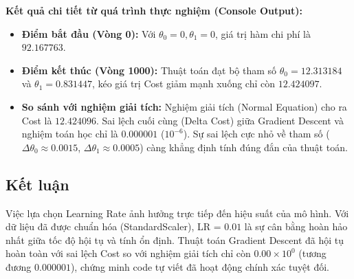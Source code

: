 \textbf{Kết quả chi tiết từ quá trình thực nghiệm (Console Output):}
\begin{itemize}
    \item \textbf{Điểm bắt đầu (Vòng 0):} Với \(\theta_0 = 0, \theta_1 = 0\), giá trị hàm chi phí là \(92.167763\).
    \item \textbf{Điểm kết thúc (Vòng 1000):} Thuật toán đạt bộ tham số \(\theta_0 = 12.313184\) và \(\theta_1 = 0.831447\), kéo giá trị Cost giảm mạnh xuống chỉ còn \(12.424097\).
    \item \textbf{So sánh với nghiệm giải tích:} Nghiệm giải tích (Normal Equation) cho ra Cost là \(12.424096\). Sai lệch cuối cùng (Delta Cost) giữa Gradient Descent và nghiệm toán học chỉ là \(0.000001\) (\(10^{-6}\)). Sự sai lệch cực nhỏ về tham số (\(\Delta\theta_0 \approx 0.0015\), \(\Delta\theta_1 \approx 0.0005\)) càng khẳng định tính đúng đắn của thuật toán.
\end{itemize}

\subsection{Kết luận}
Việc lựa chọn Learning Rate ảnh hưởng trực tiếp đến hiệu suất của mô hình. Với dữ liệu đã được chuẩn hóa (StandardScaler), LR = \(0.01\) là sự cân bằng hoàn hảo nhất giữa tốc độ hội tụ và tính ổn định. Thuật toán Gradient Descent đã hội tụ hoàn toàn với sai lệch Cost so với nghiệm giải tích chỉ còn \(0.00 \times 10^0\) (tương đương \(0.000001\)), chứng minh code tự viết đã hoạt động chính xác tuyệt đối.
